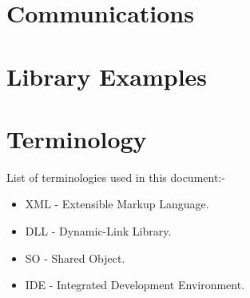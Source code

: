 \documentclass[conference]{IEEEtran}
\begin{document}
    \section{Communications}

    \section{Library Examples}

    \section{Terminology}
      List of terminologies used in this document:-
      \begin{itemize}
        \item XML - Extensible Markup Language.
        \item DLL - Dynamic-Link Library.
        \item SO - Shared Object.
        \item IDE - Integrated Development Environment.
      \end{itemize}

  \nocite{*}
	\renewcommand\refname{\section{Reference List}}
	\small{
    }
\end{document}
